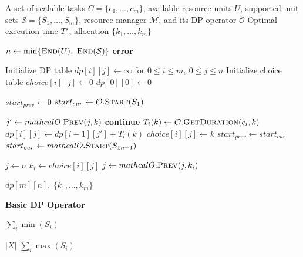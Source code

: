 \begin{algorithm}[t!]

\caption{Topology-Agnostic DPArrange}
\label{alg:unified_dp}
\begin{footnotesize}
\begin{algorithmic}[1]
\Require 
    A set of scalable tasks $C = \{c_1, \dots, c_m\}$,
    available resource units $U$,
    supported unit sets $\mathcal{S} = \{S_1, \dots, S_m\}$,
    resource manager $\mathcal{M}$, and its DP operator $\mathcal{O}$
\Ensure
    Optimal execution time $T^\star$,
    allocation $\{k_1, \dots, k_m\}$

\State $n \gets \min\{\textsc{End}(U),~\textsc{End}(\mathcal{S})\}$
    \State \Return \textbf{error} 
\EndIf

\State Initialize DP table $dp[i][j] \gets \infty$ for $0 \le i \le m,~0 \le j \le n$
\State Initialize choice table $choice[i][j] \gets 0$
\State $dp[0][0] \gets 0$

\State $start_{prev} \gets 0$
\State $start_{cur} \gets \mathcal{O}.\textsc{Start}(S_1)$

         
            \State $j' \gets mathcal{O}.\textsc{Prev}(j, k)$
                \State \textbf{continue}
            \EndIf
            \State $T_i(k) \gets \mathcal{O}.\textsc{GetDuration}(c_i, k)$
                \State $dp[i][j] \gets dp[i-1][j'] + T_i(k)$
                \State $choice[i][j] \gets k$
            \EndIf
        \EndFor
    \EndFor
    \State $start_{prev} \gets start_{cur}$
    \State $start_{cur} \gets mathcal{O}.\textsc{Start}(S_{1:i+1})$
\EndFor

\State $j \gets n$
    \State $k_i \gets choice[i][j]$
    \State $j \gets mathcal{O}.\textsc{Prev}(j, k_i)$
\EndFor

\State \Return $dp[m][n],~\{k_1, \dots, k_m\}$

\Statex
\Statex \textbf{Basic DP Operator}

    \State \Return $\sum_i \min(S_i)$
\EndFunction

        \State \Return $|X|$
    \Else
        \State \Return $\sum_i \max(S_i)$
    \EndIf
\EndFunction


\end{algorithmic}
\end{footnotesize}
\end{algorithm}
